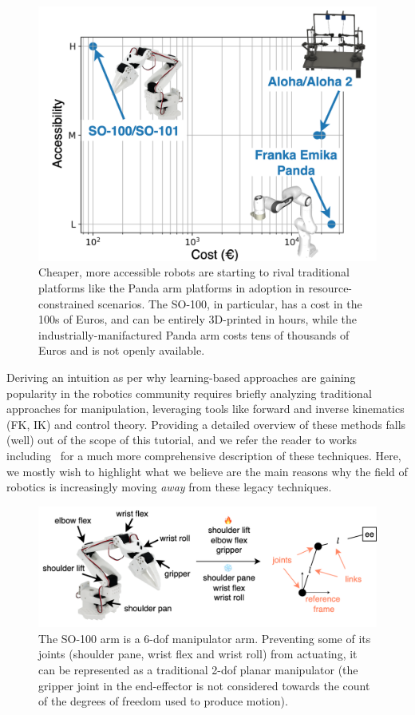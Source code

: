 \begin{figure}
    \centering
    \includegraphics[width=0.4\linewidth]{figures/ch2/ch2-cost-accessibility.png}
    \caption{Cheaper, more accessible robots are starting to rival traditional platforms like the Panda arm platforms in adoption in resource-constrained scenarios. The SO-100, in particular, has a cost in the 100s of Euros, and can be entirely 3D-printed in hours, while the industrially-manifactured Panda arm costs tens of thousands of Euros and is not openly available.}
    \label{fig:robotic-platforms-costs}
\end{figure}

Deriving an intuition as per why learning-based approaches are gaining popularity in the robotics community requires briefly analyzing traditional approaches for manipulation, leveraging tools like forward and inverse kinematics (FK, IK) and control theory.
Providing a detailed overview of these methods falls (well) out of the scope of this tutorial, and we refer the reader to works including~\citet{sicilianoSpringerHandbookRobotics2016, lynchModernRoboticsMechanics2017, tedrakeRoboticManipulationPerception, tedrakeUnderactuatedRoboticsAlgorithms} for a much more comprehensive description of these techniques.
Here, we mostly wish to highlight what we believe are the main reasons why the field of robotics is increasingly moving \emph{away} from these legacy techniques.

\begin{figure}
    \centering
    \includegraphics[width=0.7\linewidth]{figures/ch2/ch2-so100-to-planar-manipulator.png}
    \caption{The SO-100 arm is a 6-dof manipulator arm. Preventing some of its joints (shoulder pane, wrist flex and wrist roll) from actuating, it can be represented as a traditional 2-dof planar manipulator (the gripper joint in the end-effector is not considered towards the count of the degrees of freedom used to produce motion).}
    \label{fig:make-so100-planar-manipulator}
\end{figure}

